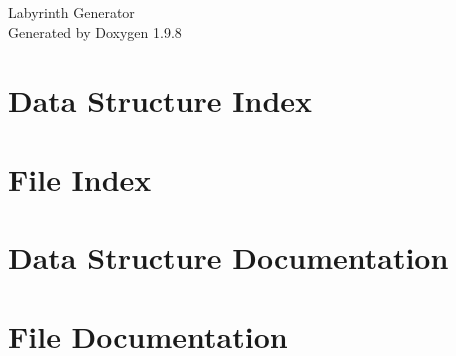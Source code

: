 \documentclass[twoside]{book}
\newcommand{\+}{\discretionary{\mbox{\scriptsize$\hookleftarrow$}}{}{}}
\newcommand{\clearemptydoublepage}{%
    \newpage{\pagestyle{empty}\cleardoublepage}%
  }
\begin{document}
  \raggedbottom
    \hypersetup{pageanchor=false,
                bookmarksnumbered=true,
                pdfencoding=unicode
               }
  \begin{titlepage}
  \vspace*{7cm}
  \begin{center}%
  {\Large Labyrinth Generator}\\
  \vspace*{1cm}
  {\large Generated by Doxygen 1.9.8}\\
  \end{center}
  \end{titlepage}
  \clearemptydoublepage
  \tableofcontents
  \clearemptydoublepage
  \hypersetup{pageanchor=true}

\chapter{Data Structure Index}

\chapter{File Index}

\chapter{Data Structure Documentation}








\chapter{File Documentation}


























  \backmatter
  \newpage
  \clearemptydoublepage
  \printindex
\end{document}
